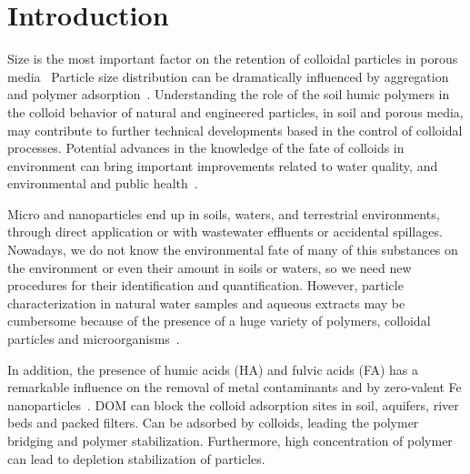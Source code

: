 \documentclass[journal=langd5,manuscript=article]{achemso}
\begin{document}
\section{Introduction}







Size is the most important factor on the retention of colloidal particles in porous media~\cite{Sirivithayapakorn2003,Sen2006}
Particle size distribution can be dramatically influenced by aggregation and polymer adsorption~\cite{Fang2009}.
Understanding  the role of the soil humic polymers in the colloid behavior of natural and engineered particles, in soil and porous media, may contribute to further technical developments based in the control of colloidal processes. Potential advances  in the knowledge of the fate of colloids in environment can bring important improvements related to water quality, and environmental and public health~\cite{Ngo2008,Farre2011}.


Micro and nanoparticles end up in soils, waters, and  terrestrial environments, through direct application or with wastewater effluents or accidental spillages. Nowadays, we do not know the environmental fate of many of this substances on the environment or even their amount in soils or waters, so we need new procedures for their identification and quantification. However, particle characterization in natural water samples and aqueous extracts may be cumbersome because of the presence of a huge variety of polymers, colloidal particles and microorganisms~\cite{Ngo2008}. 


In addition, the presence of humic acids (HA) and fulvic acids (FA) has a remarkable influence on the removal of metal contaminants 
  and   by zero-valent Fe nanoparticles~\cite{Mak2011234}.
DOM can block the colloid adsorption sites in soil,  aquifers, river beds and packed filters. Can be adsorbed by colloids,  leading the polymer bridging and polymer stabilization. Furthermore,   high concentration of polymer can lead to depletion stabilization of  particles. 
\end{document}
